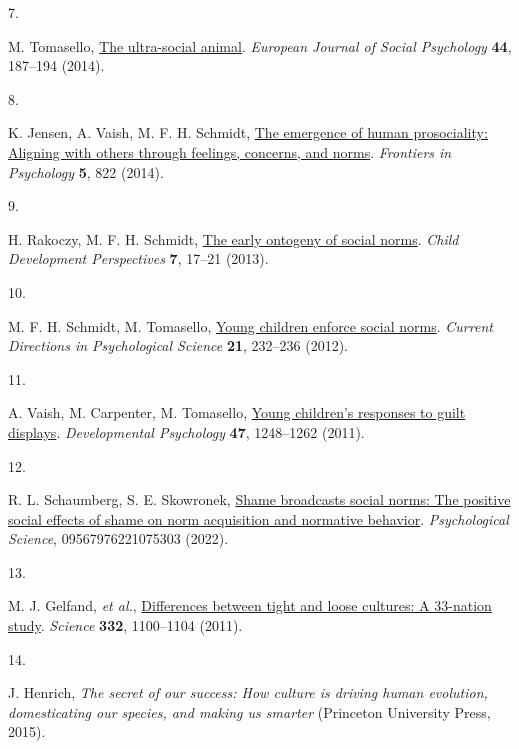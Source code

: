 \documentclass[
  man,floatsintext]{apa6}
\newlength{\cslhangindent}
\newlength{\csllabelwidth}
\newlength{\cslentryspacingunit} %
\newenvironment{CSLReferences}[2] %
 {%
  \setlength{\parindent}{0pt}
  \ifodd #1
  \let\oldpar\par
  \def\par{\hangindent=\cslhangindent\oldpar}
  \fi
  \setlength{\parskip}{#2\cslentryspacingunit}
 }%
 {}
\newcommand{\CSLLeftMargin}[1]{\parbox[t]{\csllabelwidth}{#1}}
\newcommand{\CSLRightInline}[1]{\parbox[t]{\linewidth - \csllabelwidth}{#1}\break}
\begin{document}
\begin{CSLReferences}{0}{0}
\leavevmode{}%
\CSLLeftMargin{7. }%
\CSLRightInline{M. Tomasello, \href{https://doi.org/10.1002/ejsp.2015}{The ultra-social animal}. \emph{European Journal of Social Psychology} \textbf{44}, 187--194 (2014).}

\leavevmode{}%
\CSLLeftMargin{8. }%
\CSLRightInline{K. Jensen, A. Vaish, M. F. H. Schmidt, \href{https://doi.org/10.3389/fpsyg.2014.00822}{The emergence of human prosociality: Aligning with others through feelings, concerns, and norms}. \emph{Frontiers in Psychology} \textbf{5}, 822 (2014).}

\leavevmode{}%
\CSLLeftMargin{9. }%
\CSLRightInline{H. Rakoczy, M. F. H. Schmidt, \href{https://doi.org/10.1111/cdep.12010}{The early ontogeny of social norms}. \emph{Child Development Perspectives} \textbf{7}, 17--21 (2013).}

\leavevmode{}%
\CSLLeftMargin{10. }%
\CSLRightInline{M. F. H. Schmidt, M. Tomasello, \href{https://doi.org/10.1177/0963721412448659}{Young children enforce social norms}. \emph{Current Directions in Psychological Science} \textbf{21}, 232--236 (2012).}

\leavevmode{}%
\CSLLeftMargin{11. }%
\CSLRightInline{A. Vaish, M. Carpenter, M. Tomasello, \href{https://doi.org/10.1037/a0024462}{Young children's responses to guilt displays}. \emph{Developmental Psychology} \textbf{47}, 1248--1262 (2011).}

\leavevmode{}%
\CSLLeftMargin{12. }%
\CSLRightInline{R. L. Schaumberg, S. E. Skowronek, \href{https://doi.org/10.1177/09567976221075303}{Shame broadcasts social norms: The positive social effects of shame on norm acquisition and normative behavior}. \emph{Psychological Science}, 09567976221075303 (2022).}

\leavevmode{}%
\CSLLeftMargin{13. }%
\CSLRightInline{M. J. Gelfand, \emph{et al.}, \href{https://doi.org/10.1126/science.1197754}{Differences between tight and loose cultures: A 33-nation study}. \emph{Science} \textbf{332}, 1100--1104 (2011).}

\leavevmode{}%
\CSLLeftMargin{14. }%
\CSLRightInline{J. Henrich, \emph{The secret of our success: How culture is driving human evolution, domesticating our species, and making us smarter} (Princeton University Press, 2015).}


\end{CSLReferences}
\end{document}
